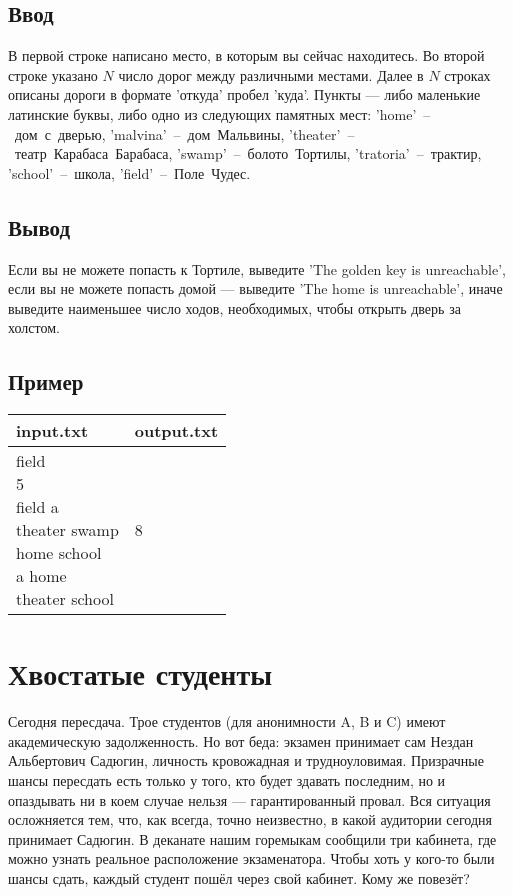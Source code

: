 \documentclass[12pt, oneside]{article}
\begin{document}
\subsection*{Ввод}

В первой строке написано место, в которым вы сейчас находитесь.
Во второй строке указано $ N $ число дорог между различными местами. Далее в $ N $ строках описаны
дороги в формате 'откуда' пробел 'куда'. Пункты --- либо маленькие латинские буквы, либо одно из следующих
памятных мест: 'home'~--~дом~с~дверью, 'malvina'~--~дом~Мальвины, 'theater'~--~театр~Карабаса~Барабаса, 
'swamp'~--~болото~Тортилы, 'tratoria'~--~трактир, 'school'~--~школа, 'field'~--~Поле~Чудес.

\subsection*{Вывод}

Если вы не можете попасть к Тортиле, выведите 'The golden key is unreachable', если вы не можете попасть домой --- 
выведите 'The home is unreachable', иначе выведите наименьшее число ходов, необходимых, чтобы открыть дверь за холстом.

\subsection*{Пример}

\begin{tabular}{|p{}|p{}|}
\hline
input.txt &output.txt \\\hline
\makecell[tl]{field\\5\\field a\\theater swamp\\home school\\a home\\theater school}
&8\\\hline
\end{tabular}

\section{Хвостатые студенты}

Сегодня пересдача. Трое студентов (для анонимности A, B и C) имеют академическую задолженность. Но вот беда:
экзамен принимает сам Нездан Альбертович Садюгин, личность кровожадная и трудноуловимая. Призрачные шансы пересдать
есть только у того, кто будет здавать последним, но и опаздывать ни в коем случае нельзя --- гарантированный провал.
Вся ситуация осложняется тем, что, как всегда, точно неизвестно, в какой аудитории сегодня принимает Садюгин. В деканате 
нашим горемыкам сообщили три кабинета, где можно узнать реальное расположение экзаменатора. Чтобы хоть у кого-то 
были шансы сдать, каждый студент пошёл через свой кабинет. Кому же повезёт?
\end{document}
